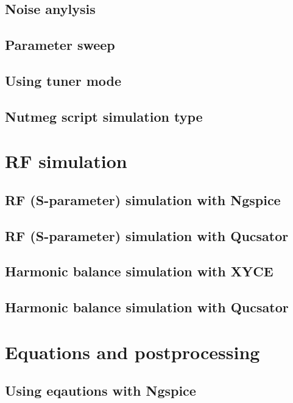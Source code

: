 \documentclass[a4paper,12pt]{article}
\begin{document}
\subsection{Noise anylysis}

\subsection{Parameter sweep}

\subsection{Using tuner mode}

\subsection{Nutmeg script simulation type}

\section{RF simulation}

\subsection{RF (S-parameter) simulation with Ngspice}

\subsection{RF (S-parameter) simulation with Qucsator}

\subsection{Harmonic balance simulation with XYCE}

\subsection{Harmonic balance simulation with Qucsator}

\section{Equations and postprocessing}

\subsection{Using eqautions with Ngspice}
\end{document}
